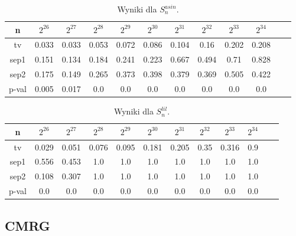 \documentclass[a4paper,11pt,twoside]{book}
\newcommand{\Slil}[1]{S^{lil}_#1}
\newcommand{\Sasin}[1]{S^{asin}_#1}
\theoremstyle{definition}
\begin{document}
\begin{table}[ht!]
\centering
 \caption{Wyniki dla $\Sasin{n}$.}
 \label{tab:minstd_asin}
\begin{tabular} {||c|c|c|c|c|c|c|c|c|c|c|c||}  
 \hline
     n &  $2^{26}$ &  $2^{27}$ &  $2^{28}$ &  $2^{29}$ &  $2^{30}$ &  $2^{31}$ &  $2^{32}$ &  $2^{33}$ &  $2^{34}$\\ \hline
    tv &  0.033 &  0.033 &  0.053 &  0.072 &  0.086 &  0.104 &   0.16 &  0.202 &  0.208\\ \hline
  sep1 &  0.151 &  0.134 &  0.184 &  0.241 &  0.223 &  0.667 &  0.494 &   0.71 &  0.828\\ \hline
  sep2 &  0.175 &  0.149 &  0.265 &  0.373 &  0.398 &  0.379 &  0.369 &  0.505 &  0.422\\ \hline
 p-val &  0.005 &  0.017 &    0.0 &    0.0 &    0.0 &    0.0 &    0.0 &    0.0 &    0.0\\ \hline


 
\end{tabular}  
\end{table}
\begin{table}[ht!]
\centering
 \caption{Wyniki dla $\Slil{n}$.}
 \label{tab:minstd_lil}
\begin{tabular} {||c|c|c|c|c|c|c|c|c|c|c|c||}  
 \hline 
     n &  $2^{26}$ &  $2^{27}$ &  $2^{28}$ &  $2^{29}$ &  $2^{30}$ &  $2^{31}$ &  $2^{32}$ &  $2^{33}$ &  $2^{34}$\\ \hline
    tv &  0.029 &  0.051 &  0.076 &  0.095 &  0.181 &  0.205 &   0.35 &  0.316 &    0.9\\ \hline
  sep1 &  0.556 &  0.453 &    1.0 &    1.0 &    1.0 &    1.0 &    1.0 &    1.0 &    1.0\\ \hline
  sep2 &  0.108 &  0.307 &    1.0 &    1.0 &    1.0 &    1.0 &    1.0 &    1.0 &    1.0\\ \hline
 p-val &    0.0 &    0.0 &    0.0 &    0.0 &    0.0 &    0.0 &    0.0 &    0.0 &    0.0\\ \hline

 
\end{tabular}  
\end{table}
\FloatBarrier
\subsection{CMRG}
\end{document}
